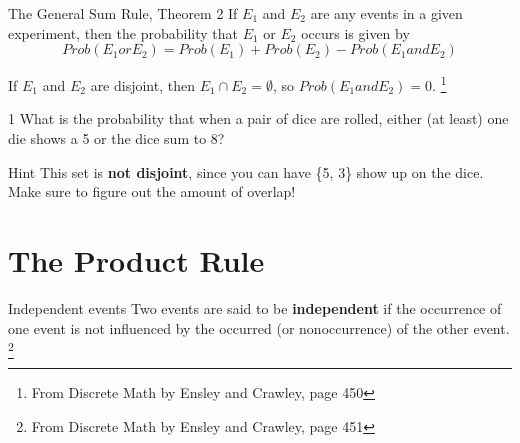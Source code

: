 \documentclass[a4paper,12pt]{book}
\newcounter{question}
\begin{document}
        \newpage
        \begin{intro}{The General Sum Rule, Theorem 2}
            If $E_1$ and $E_2$ are any events in a given experiment,
            then the probability that $E_1$ or $E_2$ occurs is given by
            $$ Prob(E_1 or E_2) = Prob(E_1) + Prob(E_2) - Prob(E_1 and E_2) $$
            
            If $E_1$ and $E_2$ are disjoint, then $E_1 \cap E_2 = \emptyset$,
            so $Prob(E_1 and E_2) = 0$.       
            \footnote{From Discrete Math by Ensley and Crawley, page 450}
        \end{intro}
        
        \begin{question}{\thequestion}{1}
            What is the probability that when a pair of dice are rolled,
            either (at least) one die shows a 5 or the dice sum to 8?
            \begin{hint}{Hint}
                This set is \textbf{not disjoint}, since you can have
                \{5, 3\} show up on the dice. Make sure to figure out
                the amount of overlap!
            \end{hint}

        \end{question}

    \newpage
    \section{The Product Rule}

        \begin{intro}{Independent events}
            Two events are said to be \textbf{independent} if the occurrence
            of one event is not influenced by the occurred (or nonoccurrence)
            of the other event.
            \footnote{From Discrete Math by Ensley and Crawley, page 451}
        \end{intro}
\end{document}
